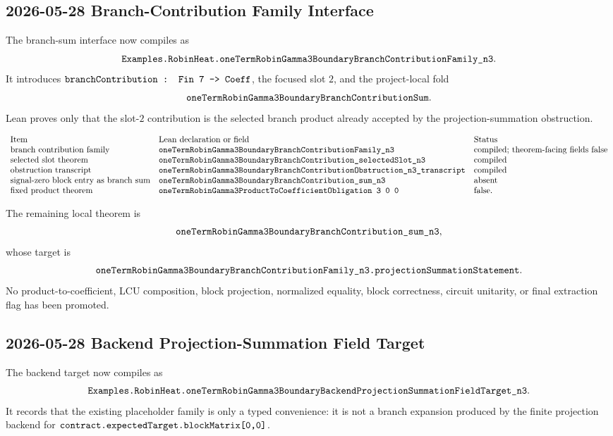 \subsection{2026-05-28 Branch-Contribution Family Interface}

The branch-sum interface now compiles as
\[
  \texttt{Examples.RobinHeat.oneTermRobinGamma3BoundaryBranchContributionFamily\_n3}.
\]
It introduces \(\texttt{branchContribution : Fin 7 -> Coeff}\), the focused
slot \(2\), and the project-local fold
\[
  \texttt{oneTermRobinGamma3BoundaryBranchContributionSum}.
\]
Lean proves only that the slot-\(2\) contribution is the selected branch
product already accepted by the projection-summation obstruction.

\[
\begin{array}{lll}
\text{Item} & \text{Lean declaration or field} & \text{Status}\\
\text{branch contribution family} &
\texttt{oneTermRobinGamma3BoundaryBranchContributionFamily\_n3} &
\text{compiled; theorem-facing fields false}\\
\text{selected slot theorem} &
\texttt{oneTermRobinGamma3BoundaryBranchContribution\_selectedSlot\_n3} &
\text{compiled}\\
\text{obstruction transcript} &
\texttt{oneTermRobinGamma3BoundaryBranchContributionObstruction\_n3\_transcript} &
\text{compiled}\\
\text{signal-zero block entry as branch sum} &
\texttt{oneTermRobinGamma3BoundaryBranchContribution\_sum\_n3} &
\text{absent}\\
\text{fixed product theorem} &
\texttt{oneTermRobinGamma3ProductToCoefficientObligation\ 3\ 0\ 0} &
\text{false}.
\end{array}
\]

The remaining local theorem is
\[
  \texttt{oneTermRobinGamma3BoundaryBranchContribution\_sum\_n3},
\]
whose target is
\[
  \texttt{oneTermRobinGamma3BoundaryBranchContributionFamily\_n3.projectionSummationStatement}.
\]
No product-to-coefficient, LCU composition, block projection, normalized
equality, block correctness, circuit unitarity, or final extraction flag has
been promoted.

\subsection{2026-05-28 Backend Projection-Summation Field Target}

The backend target now compiles as
\[
  \texttt{Examples.RobinHeat.oneTermRobinGamma3BoundaryBackendProjectionSummationFieldTarget\_n3}.
\]
It records that the existing placeholder family is only a typed convenience:
it is not a branch expansion produced by the finite projection backend for
\(\texttt{contract.expectedTarget.blockMatrix[0,0]}\).

